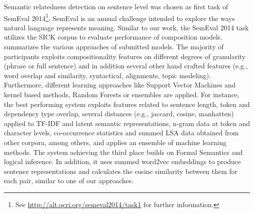 Semantic relatedness detection on sentence level was chosen as first task of SemEval 2014\footnote{See \url{http://alt.qcri.org/semeval2014/task1} for further information.}. SemEval is an annual challenge intended to explore the ways natural language represents meaning. Similar to our work, the SemEval 2014 task utilizes the SICK \autocite{marelli_sick_2014} corpus to evaluate performance of composition models. \textcite{marelli_semeval-2014_2014} summarizes the various approaches of submitted models. The majority of participants exploits compositionality features on different degrees of granularity (phrase or full sentence) and in addition several other hand crafted features (e.g., word overlap and similarity, syntactical, alignments, topic modeling). Furthermore, different learning approaches like Support Vector Machines \autocite{cortes_support-vector_1995} and kernel based methods, Random Forests \autocite{breiman_random_2001} or ensembles \autocite{opitz_popular_1999} are applied. For instance, the best performing system \autocite{zhao_ecnu_2014} exploits features related to sentence length, token and dependency type overlap, several distances (e.g., jaccard, cosine, manhatten) applied to \ac{TF-IDF} and latent semantic representations, n-gram data at token and character levels, co-occurrence statistics and summed \ac{LSA} data obtained from other corpora, among others, and applies an ensemble of machine learning methods. The system achieving the third place \autocite{bjerva_meaning_2014} builds on Formal Semantics and logical inference. In addition, it uses summed word2vec \autocite{mikolov_distributed_2013} embeddings to produce sentence representations and calculates the cosine similarity between them for each pair, similar to one of our approaches.

